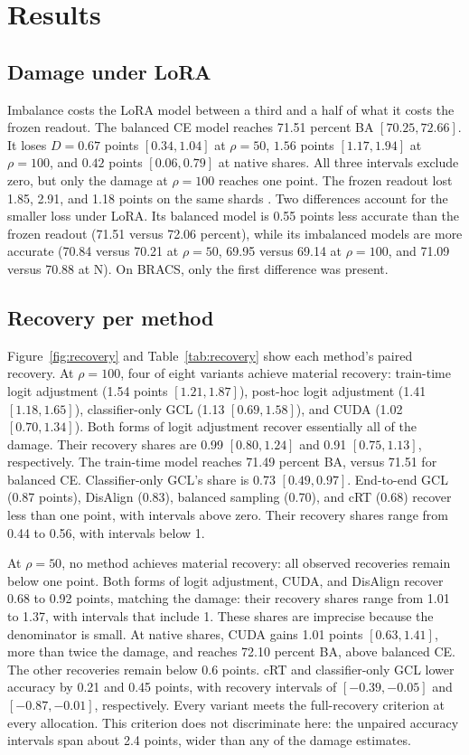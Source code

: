 \section{Results}
\label{sec:results}

\subsection{Damage under LoRA}
Imbalance costs the LoRA model between a third and a half of what it costs the frozen readout. The balanced CE model reaches 71.51 percent BA $[70.25, 72.66]$. It loses $D=0.67$ points $[0.34, 1.04]$ at $\rho=50$, $1.56$ points $[1.17, 1.94]$ at $\rho=100$, and $0.42$ points $[0.06, 0.79]$ at native shares. All three intervals exclude zero, but only the damage at $\rho=100$ reaches one point. The frozen readout lost 1.85, 2.91, and 1.18 points on the same shards \citep{queisler2026prevalenceTcga}. Two differences account for the smaller loss under LoRA. Its balanced model is 0.55 points less accurate than the frozen readout (71.51 versus 72.06 percent), while its imbalanced models are more accurate (70.84 versus 70.21 at $\rho=50$, 69.95 versus 69.14 at $\rho=100$, and 71.09 versus 70.88 at N). On BRACS, only the first difference was present.

\subsection{Recovery per method}
Figure~\ref{fig:recovery} and Table~\ref{tab:recovery} show each method's paired recovery. At $\rho=100$, four of eight variants achieve material recovery: train-time logit adjustment (1.54 points $[1.21, 1.87]$), post-hoc logit adjustment (1.41 $[1.18, 1.65]$), classifier-only GCL (1.13 $[0.69, 1.58]$), and CUDA (1.02 $[0.70, 1.34]$). Both forms of logit adjustment recover essentially all of the damage. Their recovery shares are 0.99 $[0.80, 1.24]$ and 0.91 $[0.75, 1.13]$, respectively. The train-time model reaches 71.49 percent BA, versus 71.51 for balanced CE. Classifier-only GCL's share is 0.73 $[0.49, 0.97]$. End-to-end GCL (0.87 points), DisAlign (0.83), balanced sampling (0.70), and cRT (0.68) recover less than one point, with intervals above zero. Their recovery shares range from 0.44 to 0.56, with intervals below 1.

At $\rho=50$, no method achieves material recovery: all observed recoveries remain below one point. Both forms of logit adjustment, CUDA, and DisAlign recover 0.68 to 0.92 points, matching the damage: their recovery shares range from 1.01 to 1.37, with intervals that include 1. These shares are imprecise because the denominator is small. At native shares, CUDA gains 1.01 points $[0.63, 1.41]$, more than twice the damage, and reaches 72.10 percent BA, above balanced CE. The other recoveries remain below 0.6 points. cRT and classifier-only GCL lower accuracy by 0.21 and 0.45 points, with recovery intervals of $[-0.39, -0.05]$ and $[-0.87, -0.01]$, respectively. Every variant meets the full-recovery criterion at every allocation. This criterion does not discriminate here: the unpaired accuracy intervals span about 2.4 points, wider than any of the damage estimates.

